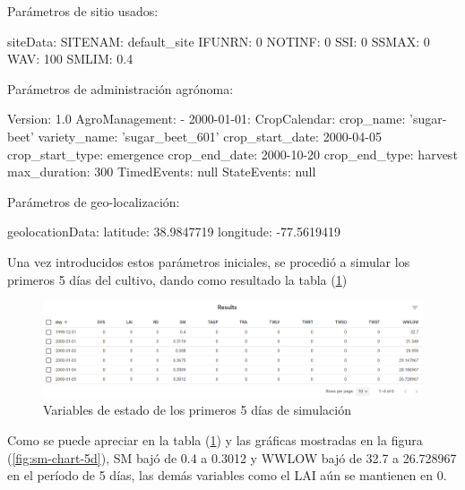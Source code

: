 Parámetros de sitio usados:

\begin{python}
siteData:
	SITENAM: default_site
	IFUNRN: 0
	NOTINF: 0
	SSI: 0
	SSMAX: 0
	WAV: 100
	SMLIM: 0.4
\end{python}

Parámetros de administración agrónoma:

\begin{python}
Version: 1.0
AgroManagement:
- 2000-01-01:
	CropCalendar:
		crop_name: 'sugar-beet'
		variety_name: 'sugar_beet_601'
		crop_start_date: 2000-04-05
		crop_start_type: emergence
		crop_end_date: 2000-10-20
		crop_end_type: harvest
		max_duration: 300
	TimedEvents: null
	StateEvents: null
\end{python}

Parámetros de geo-localización:

\begin{python}
geolocationData:
	latitude: 38.9847719
	longitude: -77.5619419
\end{python}

Una vez introducidos estos parámetros iniciales, se procedió a simular los primeros 5 días del cultivo, dando como resultado la tabla (\ref{fig:5d-table})

\begin{figure}[!h]
	\centering
	\includegraphics[width=1\linewidth]{Images/5d-table}
	\caption{Variables de estado de los primeros 5 días de simulación}
	\label{fig:5d-table}
\end{figure}

Como se puede apreciar en la tabla (\ref{fig:5d-table}) y las gráficas mostradas en la figura (\ref{fig:sm-chart-5d}), SM bajó de 0.4 a 0.3012 y WWLOW bajó de 32.7 a 26.728967 en el período de 5 días, las demás variables como el LAI aún se mantienen en 0.

